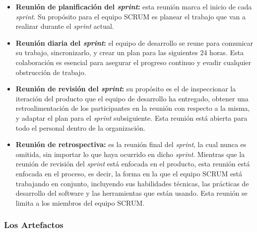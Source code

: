 			\begin{itemize}
				\item \textbf{Reuni\'{o}n de planificaci\'{o}n del \textit{sprint}: }
				esta reuni\'{o}n marca el inicio de cada \textit{sprint}. Su prop\'{o}sito para el equipo SCRUM es planear el trabajo que van a realizar durante el \textit{sprint} actual.
				
				\item \textbf{Reuni\'{o}n diaria del \textit{sprint}: }
				el equipo de desarrollo se reune para comunicar su trabajo, sincronizarlo, y crear un plan para las siguientes 24 horas. Esta colaboraci\'{o}n es esencial para asegurar el progreso continuo y evadir cualquier obstrucci\'{o}n de trabajo.
				
				\item \textbf{Reuni\'{o}n de revisi\'{o}n del \textit{sprint}: }
				su prop\'{o}sito es el de inspeccionar la iteraci\'{o}n del producto que el equipo de desarrollo ha entregado, obtener una retroalimentaci\'{o}n de los participantes en la reuni\'{o}n con respecto a la misma, y adaptar el plan para el \textit{sprint} subsiguiente. Esta reuni\'{o}n est\'{a} abierta para todo el personal dentro de la organizaci\'{o}n.
				
				\item \textbf{Reuni\'{o}n de retrospectiva: }
				es la reuni\'{o}n final del \textit{sprint}, la cual nunca es omitida, sin importar lo que haya ocurrido en dicho \textit{sprint}. Mientras que la reuni\'{o}n de revisi\'{o}n del \textit{sprint} est\'{a} enfocada en el producto, esta reuni\'{o}n est\'{a} enfocada en el proceso, es decir, la forma en la que el equipo SCRUM est\'{a} trabajando en conjunto, incluyendo sus habilidades t\'{e}cnicas, las pr\'{a}cticas de desarrollo del software y las herramientas que est\'{a}n usando. Esta reuni\'{o}n se limita a los miembros del equipo SCRUM.
				
			\end{itemize}
			
		\subsubsection{Los Artefactos}
			
